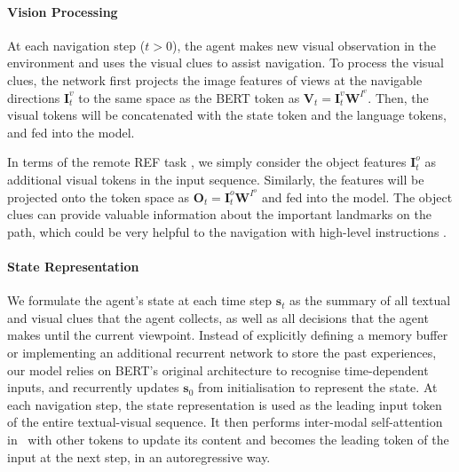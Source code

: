 \documentclass[final]{cvpr}
\begin{document}
\vspace{-14pt}
\paragraph{Vision Processing}
At each navigation step ($t{>}0$), the agent makes new visual observation in the environment and uses the visual clues to assist navigation. To process the visual clues, the network first projects the image features of views at the navigable directions $\boldsymbol{I}^{v}_{t}$ to the same space as the BERT token as $\boldsymbol{V}_{\!t}{=}\boldsymbol{I}^{v}_{t}\boldsymbol{W}^{I^{v}}$. Then, the visual tokens will be concatenated with the state token and the language tokens, and fed into the model.

In terms of the remote REF task \cite{qi2020reverie}, we simply consider the object features $\boldsymbol{I}^{o}_{t}$ as additional visual tokens in the input sequence. Similarly, the features will be projected onto the token space as $\boldsymbol{O}_{t}{=}\boldsymbol{I}^{o}_{t}\boldsymbol{W}^{I^{o}}$ and fed into the model. The object clues can provide valuable information about the important landmarks on the path, which could be very helpful to the navigation with high-level instructions \cite{qi2020reverie}.



\vspace{-14pt}
\paragraph{State Representation} 
We formulate the agent's state at each time step $\boldsymbol{s}_{t}$ as the summary of all textual and visual clues that the agent collects, as well as all decisions that the agent makes until the current viewpoint. Instead of explicitly defining a memory buffer \cite{zhu2020babywalk} or implementing an additional recurrent network \cite{hochreiter1997long} to store the past experiences, our model relies on BERT's original architecture to recognise time-dependent inputs, and recurrently updates $\boldsymbol{s}_{0}$ from initialisation to represent the state.
At each navigation step, the state representation is used as the leading input token of the entire textual-visual sequence. It then performs inter-modal self-attention in \vlnbert~with other tokens to update its content and becomes the leading token of the input at the next step, in an autoregressive way.

\vspace{-14pt}
\end{document}
